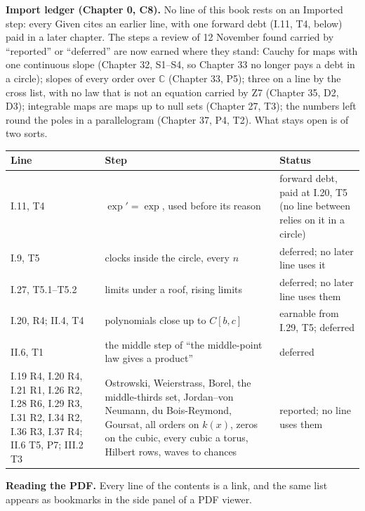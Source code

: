 \textbf{Import ledger (Chapter 0, C8).} No line of this book rests on an Imported step: every Given cites an earlier line, with one forward debt (I.11, T4, below) paid in a later chapter. The steps a review of 12 November found carried by ``reported'' or ``deferred'' are now earned where they stand: Cauchy for maps with one continuous slope (Chapter 32, S1--S4, so Chapter 33 no longer pays a debt in a circle); slopes of every order over $\mathbb{C}$ (Chapter 33, P5); three on a line by the cross list, with no law that is not an equation carried by Z7 (Chapter 35, D2, D3); integrable maps are maps up to null sets (Chapter 27, T3); the numbers left round the poles in a parallelogram (Chapter 37, P4, T2). What stays open is of two sorts.
\begin{center}
\renewcommand{\arraystretch}{1.2}
{\small
\begin{tabular}{@{}>{\raggedright\arraybackslash}p{3.4cm} >{\raggedright\arraybackslash}p{6.2cm} >{\raggedright\arraybackslash}p{3.6cm}@{}}
\textbf{Line} & \textbf{Step} & \textbf{Status} \\ \hline
I.11, T4 & $\exp' = \exp$, used before its reason & forward debt, paid at I.20, T5 (no line between relies on it in a circle) \\
I.9, T5 & clocks inside the circle, every $n$ & deferred; no later line uses it \\
I.27, T5.1--T5.2 & limits under a roof, rising limits & deferred; no later line uses them \\
I.20, R4; II.4, T4 & polynomials close up to $C[b,c]$ & earnable from I.29, T5; deferred \\
II.6, T1 & the middle step of ``the middle-point law gives a product'' & deferred \\
I.19 R4, I.20 R4, I.21 R1, I.26 R2, I.28 R6, I.29 R3, I.31 R2, I.34 R2, I.36 R3, I.37 R4; II.6 T5, P7; III.2 T3 & Ostrowski, Weierstrass, Borel, the middle-thirds set, Jordan--von Neumann, du Bois-Reymond, Goursat, all orders on $k(x)$, zeros on the cubic, every cubic a torus, Hilbert rows, waves to chances & reported; no line uses them \\
\end{tabular}}
\end{center}

\textbf{Reading the PDF.} Every line of the contents is a link, and the same list appears as bookmarks in the side panel of a PDF viewer.

\newpage

\newpage

\newpage

\newpage


